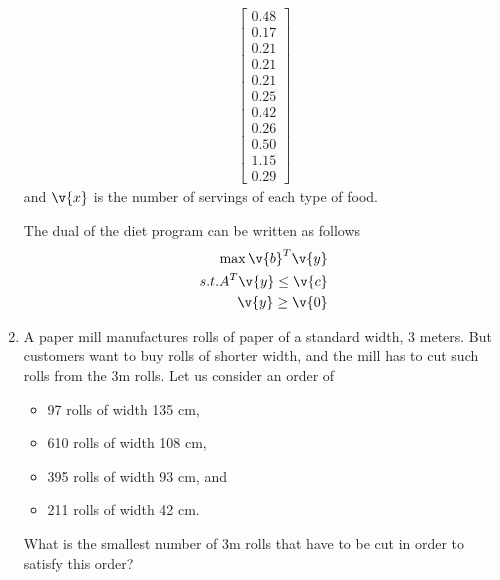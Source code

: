 \documentclass[11pt, oneside]{article}
\begin{document}
\begin{enumerate}
\begin{align*}
\begin{bmatrix}
                0.48 \\ %
                0.17 \\ %
                0.21 \\ %
                0.21 \\ %
                0.21 \\ %
                0.25 \\ %
                0.42 \\ %
                0.26 \\ %
                0.50 \\ %
                1.15 \\ %
                0.29    %
            \end{bmatrix}
        \end{align*}
        and $\v{x}$ is the number of servings of each type of food.

        The dual of the diet program can be written as follows
        \begin{align*}
            \max \v{b}^T \v{y} \\
            s.t. A^T \v{y} \le \v{c} \\
            \v{y} \ge \v{0}
        \end{align*}

    \item %
        A paper mill manufactures rolls of paper of a standard width, 3 meters.
        But customers want to buy rolls of shorter width, and the mill has to
        cut such rolls from the 3m rolls.
        Let us consider an order of
        \begin{itemize}
            \item 97 rolls of width 135 cm,
            \item 610 rolls of width 108 cm,
            \item 395 rolls of width 93 cm, and
            \item 211 rolls of width 42 cm.
        \end{itemize}
        What is the smallest number of 3m rolls that have to be cut in order to
        satisfy this order?


\end{enumerate}
\end{document}
